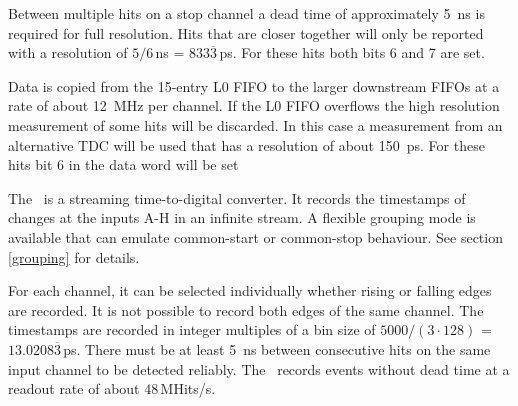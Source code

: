 {    Between multiple hits on a stop channel a dead time of approximately \SI{5}{\nano\second} is required for full resolution. 
    Hits that are closer together will only be reported with a resolution of $5/6$\,\si{\nano\second} = $833\overline{3}$\,\si{\pico\second}. For these hits both bits 6 and 7 are set.

    Data is copied from the 15-entry L0 FIFO to the larger downstream FIFOs at a rate of about \SI{12}{\mega\hertz} per channel. 
    If the L0 FIFO overflows the high resolution measurement of some hits will be discarded. 
    In this case a measurement from an alternative TDC will be used that has a resolution of about \SI{150}{\pico\second}. 
    For these hits bit 6 in the data word will be set
} { %
    The \deviceName\ is a streaming time-to-digital converter. It records the timestamps of changes at the inputs A-H in an infinite stream. 
    A flexible grouping mode is available that can emulate common-start or common-stop behaviour. See section \ref{grouping} for details.

    For each channel, it can be selected individually whether rising or falling edges are recorded. It is not possible to record both edges of the same channel. 
    The timestamps are recorded in integer multiples of a bin size of $5000/(3\cdot 128)$ = $13.0208\overline{3}$\,\si{\pico\second}. 
    There must be at least \SI{5}{\nano\second} between consecutive hits on the same input channel to be detected reliably. 
    The \deviceName\ records events without dead time at a readout rate of about $48$\,MHits/s.
}